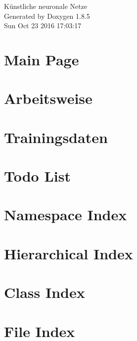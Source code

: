 \documentclass[twoside]{book}
\newcommand{\clearemptydoublepage}{%
  \newpage{\pagestyle{empty}\cleardoublepage}%
}
\begin{document}
\hypersetup{pageanchor=false}
\begin{titlepage}
\vspace*{7cm}
\begin{center}%
{\Large Künstliche neuronale Netze }\\
\vspace*{1cm}
{\large Generated by Doxygen 1.8.5}\\
\vspace*{0.5cm}
{\small Sun Oct 23 2016 17:03:17}\\
\end{center}
\end{titlepage}
\clearemptydoublepage
\tableofcontents
\clearemptydoublepage
{}
\hypersetup{pageanchor=true}

\chapter{Main Page}
\label{index}\hypertarget{index}{}
\chapter{Arbeitsweise}
\label{_arbeitsweise}
\hypertarget{_arbeitsweise}{}

\chapter{Trainingsdaten}
\label{_trainingsdaten}
\hypertarget{_trainingsdaten}{}

\chapter{Todo List}
\label{todo}
\hypertarget{todo}{}

\chapter{Namespace Index}

\chapter{Hierarchical Index}

\chapter{Class Index}

\chapter{File Index}

\end{document}
